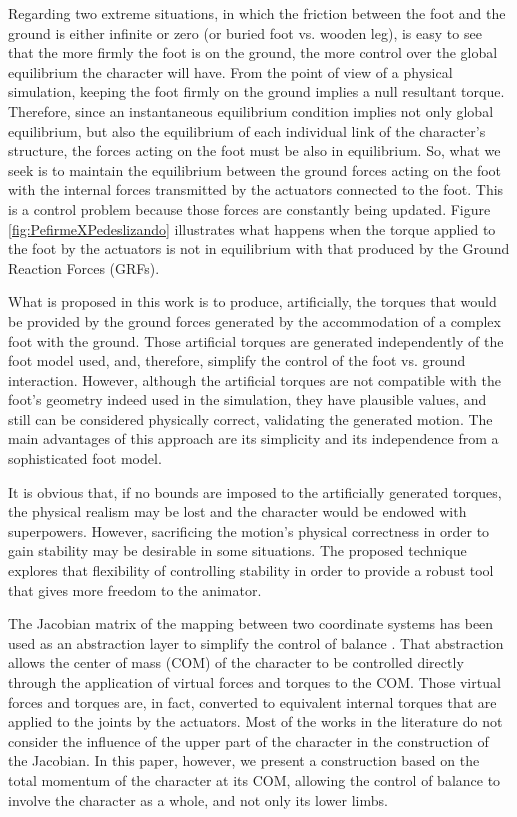 \documentclass[tog]{acmsiggraph}
\begin{document}
Regarding two extreme situations, in which the friction between the foot and the ground is either infinite or zero (or buried foot vs. wooden leg),
is easy to see that the more
firmly the foot is on the ground, the more control over the global equilibrium the character will have. From the point of view of a physical
simulation, keeping the foot firmly on the ground implies a null resultant torque. Therefore, since an instantaneous equilibrium condition 
implies not only global equilibrium, but also the equilibrium of each individual link of the character’s structure, the forces acting on the foot 
must be also in equilibrium. So, what we seek is to maintain the equilibrium between the ground forces acting on the foot with the internal
forces transmitted by the actuators connected to the foot. This is a control problem because those forces are constantly being updated. Figure 
\ref{fig:PefirmeXPedeslizando} illustrates what happens when the torque applied to the foot by the actuators is not in equilibrium with that
produced by the Ground Reaction Forces (GRFs).

What is proposed in this work is to produce, artificially, the torques that would be provided by the ground forces generated by the accommodation
of a complex foot with the ground. Those artificial torques are generated independently of the foot model used, and, therefore, simplify the 
control of the foot vs. ground interaction. However, although the artificial torques are not compatible with the foot’s geometry indeed used in 
the simulation, they have plausible values, and still can be considered physically correct, validating the generated motion. The main advantages
of this approach are its simplicity and its independence from a sophisticated foot model.

It is obvious that, if no bounds are imposed to the artificially generated torques, the physical realism may be lost and the character would be 
endowed with superpowers. However, sacrificing the motion’s physical correctness in order to gain stability may be desirable in some situations. 
The proposed technique explores that flexibility of controlling stability in order to provide a robust tool that gives more freedom to the 
animator.

The Jacobian matrix of the mapping between two coordinate systems has been used as an abstraction layer to simplify the control of balance
\cite{bib:Coros10,bib:GeijtenbeekState12,bib:Geijtenbeek12}. That abstraction allows the center of mass (COM) of the character
to be controlled directly through the application of virtual forces and torques to the COM. Those virtual forces and torques are, in fact,
converted to equivalent internal torques that are applied to the joints by the actuators. Most of the works in the literature do not consider
the influence of the upper part of the character in the construction of the Jacobian. In this paper, however, we present a construction based
on the total momentum of the character at its COM, allowing the control of balance to involve the character as a whole, and not only its 
lower limbs.
\end{document}
